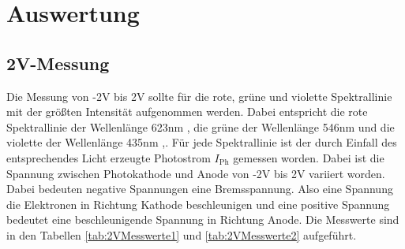 \section{Auswertung}
\label{sec:Auswertung}
\subsection{2V-Messung}
Die Messung von -2V bis 2V sollte für die rote, grüne und violette Spektrallinie mit der größten Intensität
aufgenommen werden. Dabei entspricht die rote Spektrallinie der Wellenlänge 623nm , die grüne der Wellenlänge 546nm und
die violette der Wellenlänge 435nm \cite{sample},\cite{Spektrum}. Für jede Spektrallinie 
ist der durch Einfall des entsprechendes Licht erzeugte Photostrom $I_\text{Ph}$ gemessen worden. Dabei ist die Spannung zwischen Photokathode und
Anode von -2V bis 2V variiert worden. Dabei bedeuten negative Spannungen eine Bremsspannung. Also eine Spannung die Elektronen in Richtung
Kathode beschleunigen und eine positive Spannung bedeutet eine beschleunigende Spannung in Richtung Anode. Die Messwerte sind in den Tabellen \ref{tab:2VMesswerte1} und \ref{tab:2VMesswerte2}
aufgeführt.
